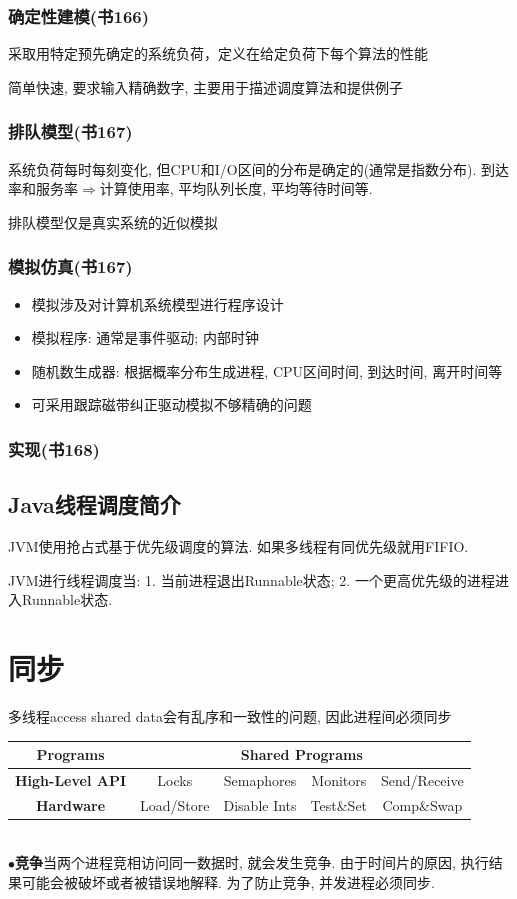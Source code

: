 \documentclass[a4paper, UTF8]{article}
\newcommand{\keypoint}[2]{$\bullet$\textbf{#1}\quad#2\par}
\begin{document}
\subsubsection{确定性建模(书166)}
采取用特定预先确定的系统负荷，定义在给定负荷下每个算法的性能\par
简单快速, 要求输入精确数字, 主要用于描述调度算法和提供例子\par
\subsubsection{排队模型(书167)}
系统负荷每时每刻变化, 但CPU和I/O区间的分布是确定的(通常是指数分布). 到达率和服务率$\Rightarrow$计算使用率, 平均队列长度, 平均等待时间等. \par
排队模型仅是真实系统的近似模拟\par
\subsubsection{模拟仿真(书167)}
\begin{itemize}
\item 模拟涉及对计算机系统模型进行程序设计
\item 模拟程序: 通常是事件驱动; 内部时钟
\item 随机数生成器: 根据概率分布生成进程, CPU区间时间, 到达时间, 离开时间等
\item 可采用跟踪磁带纠正驱动模拟不够精确的问题
\end{itemize}
\subsubsection{实现(书168)}
\subsection{Java线程调度简介}
JVM使用抢占式基于优先级调度的算法. 如果多线程有同优先级就用FIFIO.\par
JVM进行线程调度当: 1. 当前进程退出Runnable状态; 2. 一个更高优先级的进程进入Runnable状态.
\newpage
\section{同步}
多线程access shared data会有乱序和一致性的问题, 因此进程间必须同步\par
\begin{tabular}{|c|c|c|c|c|}
\hline
\textbf{Programs} & \multicolumn{4}{|c|}{Shared Programs} \\
\hline
\textbf{High-Level API} & Locks & Semaphores & Monitors & Send/Receive \\
\hline
\textbf{Hardware} & Load/Store & Disable Ints & Test\&Set & Comp\&Swap \\
\hline
\end{tabular}\\
\keypoint{竞争}{当两个进程竞相访问同一数据时, 就会发生竞争. 由于时间片的原因, 执行结果可能会被破坏或者被错误地解释. 为了防止竞争, 并发进程必须同步.}
\end{document}
